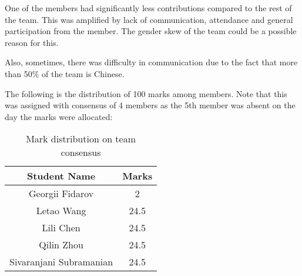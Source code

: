 One of the members had significantly less contributions compared to the rest of the team. This was amplified by lack of communication, attendance and general participation from the member. The gender skew of the team could be a possible reason for this.\newline

Also, sometimes, there was difficulty in communication due to the fact that more than 50\% of the team is Chinese.

The following is the distribution of 100 marks among members. Note that this was assigned with consensus of 4 members as the 5th member was absent on the day the marks were allocated:

\begin{table}[H]
\centering
\begin{tabular}{|c|c|}
\hline
Student Name &  Marks \\
\hline
Georgii Fidarov & 2 \\
\hline
Letao Wang & 24.5 \\
\hline
Lili Chen & 24.5 \\
\hline
Qilin Zhou & 24.5 \\
\hline
Sivaranjani Subramanian & 24.5 \\
\bottomrule
\end{tabular}
\caption{Mark distribution on team consensus}
\end{table}

